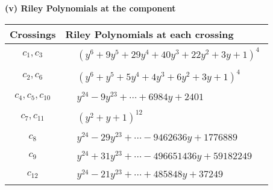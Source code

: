 \documentclass[1p]{elsarticle_modified}
\theoremstyle{definition}
\begin{document}
\flushleft \textbf{(v) Riley Polynomials at the component}\newline \\
\begin{tabular}{m{50pt}|m{274pt}}
Crossings & \hspace{64pt}Riley Polynomials at each crossing \\
\hline $$\begin{aligned}c_{1},c_{3}\end{aligned}$$&$\begin{aligned}
&(y^6+9 y^5+29 y^4+40 y^3+22 y^2+3 y+1)^4
\end{aligned}$\\
\hline $$\begin{aligned}c_{2},c_{6}\end{aligned}$$&$\begin{aligned}
&(y^6+y^5+5 y^4+4 y^3+6 y^2+3 y+1)^4
\end{aligned}$\\
\hline $$\begin{aligned}c_{4},c_{5},c_{10}\end{aligned}$$&$\begin{aligned}
&y^{24}-9 y^{23}+\cdots+6984 y+2401
\end{aligned}$\\
\hline $$\begin{aligned}c_{7},c_{11}\end{aligned}$$&$\begin{aligned}
&(y^2+y+1)^{12}
\end{aligned}$\\
\hline $$\begin{aligned}c_{8}\end{aligned}$$&$\begin{aligned}
&y^{24}-29 y^{23}+\cdots-9462636 y+1776889
\end{aligned}$\\
\hline $$\begin{aligned}c_{9}\end{aligned}$$&$\begin{aligned}
&y^{24}+31 y^{23}+\cdots-496651436 y+59182249
\end{aligned}$\\
\hline $$\begin{aligned}c_{12}\end{aligned}$$&$\begin{aligned}
&y^{24}-21 y^{23}+\cdots+485848 y+37249
\end{aligned}$\\
\hline
\end{tabular}\\~\\
\end{document}
